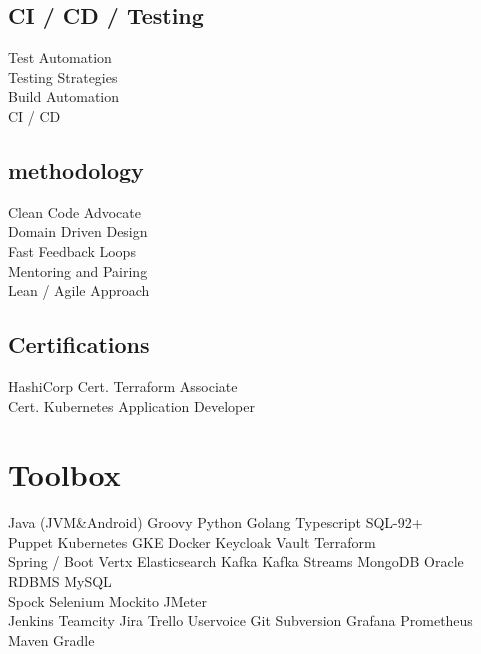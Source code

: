 \documentclass[]{resume}
\begin{document}
\begin{minipage}[t]{0.32\textwidth}
\subsection{CI / CD / Testing}
Test Automation \\
Testing Strategies \\
Build Automation \\
CI / CD \\
\sectionsep

\subsection{methodology}
Clean Code Advocate \\
Domain Driven Design \\
Fast Feedback Loops \\
Mentoring and Pairing \\
Lean / Agile Approach \\
\sectionsep

\subsection{Certifications}
HashiCorp Cert. Terraform Associate  \\
Cert. Kubernetes Application Developer \\
\sectionsep


\section{Toolbox}
Java (JVM\&Android) \textbullet{} Groovy \textbullet{} Python \textbullet{} Golang \textbullet{} Typescript \textbullet{} SQL-92+\\
Puppet \textbullet{} Kubernetes GKE \textbullet{} Docker \textbullet{} Keycloak \textbullet{} Vault \textbullet{} Terraform \\
Spring / Boot \textbullet{} Vertx \textbullet{} Elasticsearch \textbullet{} Kafka \textbullet{} Kafka Streams \textbullet{} MongoDB \textbullet{} Oracle RDBMS \textbullet{} MySQL\\
Spock \textbullet{} Selenium \textbullet{} Mockito \textbullet{} JMeter\\
Jenkins \textbullet{} Teamcity \textbullet{} Jira \textbullet{} Trello
\textbullet{} Uservoice \textbullet{} Git \textbullet{} Subversion  \textbullet{} Grafana \textbullet{} Prometheus \textbullet{} Maven 
\textbullet{} Gradle \\ 
\sectionsep

%
%

\end{minipage} 
\end{document}
